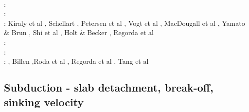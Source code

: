 \begin{scriptsize}
\cite{basc14}\cite{vamd14}\cite{kile14}\cite{jahm14}\cite{bufa14}\cite{bufy14b}\cite{chsv14}
\cite{chsg14}\cite{sigb14}\cite{shjm14}\cite{mova14}\cite{olpr14}\cite{paml14b}\cite{mafv14}\\
\twothousandfifteen: 
\cite{bemm15}\cite{bomv15}\cite{bogf15}\cite{ceag15}\cite{kifr15}\cite{vami15}\cite{dali15}
\cite{mami15}\cite{rula15}\cite{chsd15}\cite{dusc15}\cite{yotr15}\cite{cibi15}\cite{hobb15}
\cite{carr15}\\
\twothousandsixteen: 
\cite{tomy16}\cite{gukt16}\cite{robn16}\cite{mavm16}\cite{magc16}\cite{marl16}\cite{mesj16}
\cite{jada16}\cite{jada16b}\cite{liku16}\cite{chss16}\\
\twothousandseventeen: 
Kiraly et al \cite{kicf17}, Schellart \cite{sche17}, Petersen et al \cite{pest17},
Vogt et al \cite{vomc17}, MacDougall et al \cite{majf17}, Yamato \& Brun \cite{yabr17}, 
Shi et al \cite{shwl17}, Holt \& Becker \cite{hobe17}, Regorda et al \cite{rerm17}\\
\twothousandeighteen: 
\cite{yamz18}\cite{crli18}\cite{spcv18}\cite{chss18}\cite{yagz18}\cite{mazh18}\cite{pukp18}
\cite{masg18}\cite{biar18}\\
\twothousandnineteen:
\cite{magn19}\cite{mavb19}\cite{scvm19}\cite{cakc19}\cite{samo19}\cite{sihf19}\cite{meag19}
\cite{vaws19}\cite{bokg19}\cite{vawg19}\cite{cibi19}\cite{pust19}\\
\twothousandtwenty:
\cite{algg20}\cite{braf20}\cite{vamg20}\cite{dawl20}\cite{meag20}\cite{bedh20}\cite{heyg20}
\cite{kicd20}\cite{mugu20}\cite{gatt20}\cite{pust20}, Billen \cite{bill20},Roda et al \cite{rozr20}, Regorda et al \cite{relr20}, Tang et al \cite{tacm20}
\end{scriptsize}

\subsection{Subduction - slab detachment, break-off, sinking velocity}

